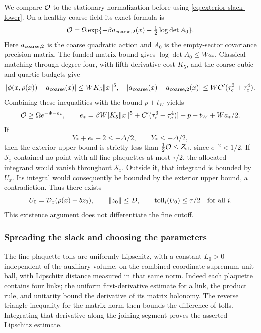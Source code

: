 We compare ${\cal O}$ to the stationary normalization before using
\eqref{eq:exterior-slack-lower}. On a healthy coarse field its exact
formula is
\[
       {\cal O}=\Omega
          \exp\{-\beta a_{{\rm coarse},2}(x)
                            -\tfrac12\log\det A_0\}.
\]
Here $a_{{\rm coarse},2}$ is the coarse quadratic action and
$A_0$ is the empty-sector covariance precision matrix. The funded
matrix bound gives $\log\det A_0\le W a_*$. Classical matching
through degree four, with fifth-derivative cost $K_5$, and the
coarse cubic and quartic budgets give
\[
 |\phi(x,\rho(x))-a_{\rm coarse}(x)|\le WK_5\|x\|^5,
 \quad |a_{\rm coarse}(x)-a_{{\rm coarse},2}(x)|
                         \le WC'(\tau_c^3+\tau_c^4).
\]
Combining these inequalities with the bound $p+t_W$ yields
\begin{equation}\label{eq:exterior-overhead-compare}
 {\cal O}\ge\Omega e^{-\Phi-e_*},\qquad
 e_*=\beta W[K_5\|x\|^5+C'(\tau_c^3+\tau_c^4)]
                                    +p+t_W+Wa_*/2.
\end{equation}
If
\begin{equation}\label{eq:exterior-two-reserves}
       Y_*+e_*+2\le-\Delta/2,\qquad Y_*\le-\Delta/2,
\end{equation}
then the exterior upper bound is strictly less than
$\tfrac12{\cal O}\le Z_{\rm sl}$, since $e^{-2}<1/2$.
If $\mathcal S_x$ contained no point with all fine plaquettes at
most $\tau/2$, the allocated integrand would vanish throughout
$\mathcal S_x$. Outside it, that integrand is bounded by $U_x$.
Its integral would consequently be bounded by the exterior upper
bound, a contradiction. Thus there exists
\[
 U_0={\cal D}_x(\rho(x)+bz_0),\qquad \|z_0\|\le D,
        \qquad\operatorname{toll}_i(U_0)\le\tau/2\quad\hbox{for all }i.
\]
This existence argument does not differentiate the fine cutoff.

\subsubsection{Spreading the slack and choosing the parameters}
The fine plaquette tolls are uniformly Lipschitz, with a constant
$L_0>0$ independent of the auxiliary volume, on the combined
coordinate supremum unit ball, with Lipschitz distance measured
in that same norm. Indeed each plaquette contains four links;
the uniform first-derivative estimate for a link, the product rule,
and unitarity bound the derivative of its matrix holonomy. The
reverse triangle inequality for the matrix norm then bounds the
difference of tolls. Integrating that derivative along the joining
segment proves the asserted Lipschitz estimate.

